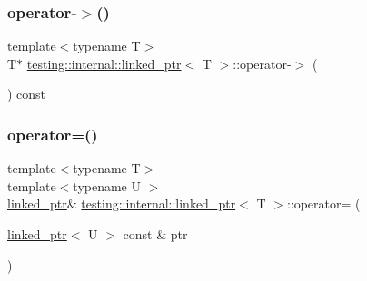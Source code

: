 \subsubsection{\texorpdfstring{operator-\/$>$()}{operator->()}}
{\footnotesize\ttfamily template$<$typename T$>$ \\
T$\ast$ \mbox{\hyperlink{classtesting_1_1internal_1_1linked__ptr}{testing\+::internal\+::linked\+\_\+ptr}}$<$ T $>$\+::operator-\/$>$ (\begin{DoxyParamCaption}{ }\end{DoxyParamCaption}) const\hspace{0.3cm}{\ttfamily [inline]}}

\mbox{\label{classtesting_1_1internal_1_1linked__ptr_a82608d98869b750d9ab729f1450a9a45}} 
\subsubsection{\texorpdfstring{operator=()}{operator=()}\hspace{0.1cm}{\footnotesize\ttfamily [1/2]}}
{\footnotesize\ttfamily template$<$typename T$>$ \\
template$<$typename U $>$ \\
\mbox{\hyperlink{classtesting_1_1internal_1_1linked__ptr}{linked\+\_\+ptr}}\& \mbox{\hyperlink{classtesting_1_1internal_1_1linked__ptr}{testing\+::internal\+::linked\+\_\+ptr}}$<$ T $>$\+::operator= (\begin{DoxyParamCaption}\item[{\mbox{\hyperlink{classtesting_1_1internal_1_1linked__ptr}{linked\+\_\+ptr}}$<$ U $>$ const \&}]{ptr }\end{DoxyParamCaption})\hspace{0.3cm}{\ttfamily [inline]}}

\mbox{\label{classtesting_1_1internal_1_1linked__ptr_a1f40b5e66e6cf7b661ea116c806f952e}} 
